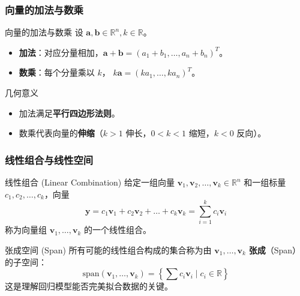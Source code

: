 \begin{frame}
\frametitle{向量的加法与数乘}

\begin{block}{向量的加法与数乘}
设 $\mathbf{a}, \mathbf{b} \in \mathbb{R}^n, k \in \mathbb{R}$。
\begin{itemize}
    \item \textbf{加法}：对应分量相加，$\mathbf{a} + \mathbf{b} = (a_1+b_1, \dots, a_n+b_n)^T$。
    \item \textbf{数乘}：每个分量乘以 $k$， $k\mathbf{a} = (ka_1, \dots, ka_n)^T$。
\end{itemize}
\end{block}

\pause

\begin{block}{几何意义}
\begin{itemize}
    \item 加法满足\textbf{平行四边形法则}。
    \item 数乘代表向量的\textbf{伸缩}（$k>1$ 伸长，$0<k<1$ 缩短，$k<0$ 反向）。
\end{itemize}
\end{block}

\end{frame}


\begin{frame}
\frametitle{线性组合与线性空间}

\begin{block}{线性组合 (Linear Combination)}
给定一组向量 $\mathbf{v}_1, \mathbf{v}_2, \dots, \mathbf{v}_k \in \mathbb{R}^n$ 和一组标量 $c_1, c_2, \dots, c_k$，向量
\[
\mathbf{y} = c_1 \mathbf{v}_1 + c_2 \mathbf{v}_2 + \dots + c_k \mathbf{v}_k = \sum_{i=1}^k c_i \mathbf{v}_i
\]
称为向量组 $\mathbf{v}_1, \dots, \mathbf{v}_k$ 的一个线性组合。
\end{block}

\begin{block}{张成空间 (Span)}
所有可能的线性组合构成的集合称为由 $\mathbf{v}_1, \dots, \mathbf{v}_k$ \textbf{张成}（Span）的子空间：
\[
\mathrm{span}(\mathbf{v}_1, \dots, \mathbf{v}_k) = \left\{ \sum c_i \mathbf{v}_i \mid c_i \in \mathbb{R} \right\}
\]
这是理解回归模型能否完美拟合数据的关键。
\end{block}

\end{frame}


